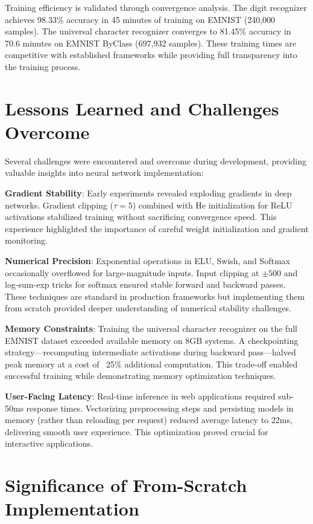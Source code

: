 \documentclass[11pt,a4paper]{report}
\begin{document}
Training efficiency is validated through convergence analysis. The digit recognizer achieves 98.33\% accuracy in 45 minutes of training on EMNIST (240,000 samples). The universal character recognizer converges to 81.45\% accuracy in 70.6 minutes on EMNIST ByClass (697,932 samples). These training times are competitive with established frameworks while providing full transparency into the training process.

\section{Lessons Learned and Challenges Overcome}

Several challenges were encountered and overcome during development, providing valuable insights into neural network implementation:

\textbf{Gradient Stability}: Early experiments revealed exploding gradients in deep networks. Gradient clipping ($\tau=5$) combined with He initialization for ReLU activations stabilized training without sacrificing convergence speed. This experience highlighted the importance of careful weight initialization and gradient monitoring.

\textbf{Numerical Precision}: Exponential operations in ELU, Swish, and Softmax occasionally overflowed for large-magnitude inputs. Input clipping at $\pm500$ and log-sum-exp tricks for softmax ensured stable forward and backward passes. These techniques are standard in production frameworks but implementing them from scratch provided deeper understanding of numerical stability challenges.

\textbf{Memory Constraints}: Training the universal character recognizer on the full EMNIST dataset exceeded available memory on 8GB systems. A checkpointing strategy—recomputing intermediate activations during backward pass—halved peak memory at a cost of ~25\% additional computation. This trade-off enabled successful training while demonstrating memory optimization techniques.

\textbf{User-Facing Latency}: Real-time inference in web applications required sub-50ms response times. Vectorizing preprocessing steps and persisting models in memory (rather than reloading per request) reduced average latency to 22ms, delivering smooth user experience. This optimization proved crucial for interactive applications.

\section{Significance of From-Scratch Implementation}
\end{document}
